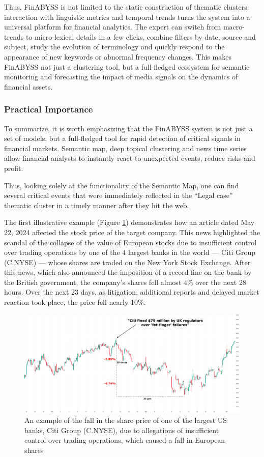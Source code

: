 Thus, FinABYSS is not limited to the static construction of thematic clusters: interaction with linguistic metrics
and temporal trends turns the system into a universal platform for financial analytics. The expert can switch from
macro-trends to micro-lexical details in a few clicks, combine filters by date, source and subject, study the evolution
of terminology and quickly respond to the appearance of new keywords or abnormal frequency changes. This makes FinABYSS
not just a clustering tool, but a full-fledged ecosystem for semantic monitoring and forecasting the impact of media
signals on the dynamics of financial assets.

\subsubsection{Practical Importance}
\label{sec:practical_importance}

To summarize, it is worth emphasizing that the FinABYSS system is not just a set of models, but a full-fledged
tool for rapid detection of critical signals in financial markets. Semantic map, deep topical clustering
and news time series allow financial analysts to instantly react to unexpected events, reduce risks
and profit.

Thus, looking solely at the functionality of the Semantic Map, one can find several critical events that were
immediately reflected in the “Legal case” thematic cluster in a timely manner after they hit the web.

The first illustrative example (Figure \ref{fig:citi_group}) demonstrates how an article dated May 22, 2024
affected the stock price of the target company. This news highlighted the scandal of the collapse of the value
of European stocks due to insufficient control over trading operations by one of the 4 largest banks
in the world --- Citi Group (C.NYSE) --- whose shares are traded on the New York Stock Exchange. After this news,
which also announced the imposition of a record fine on the bank by the British government, the company's shares
fell almost 4\% over the next 28 hours. Over the next 23 days, as litigation, additional reports and delayed
market reaction took place, the price fell nearly 10\%.

\begin{figure}[H]
    \centering
    \includegraphics[width=1\linewidth]{img/citi_group.png}
    \caption{An example of the fall in the share price of one of the largest US banks, Citi Group
    (C.NYSE), due to allegations of insufficient control over trading operations, which caused
    a fall in European shares}
    \label{fig:citi_group}
\end{figure}

